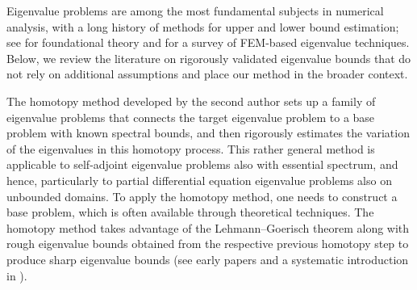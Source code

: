 \documentclass[a4,11pt]{article}
\numberwithin{equation}{section}
\begin{document}
\medskip



Eigenvalue problems are among the most fundamental subjects in numerical analysis, with a long history of methods for upper and lower bound estimation; see \cite{Babuska-Osborn-1991} for foundational theory and \cite{Boffi2010} for a survey of FEM-based eigenvalue techniques.
Below, we review the literature on rigorously validated eigenvalue bounds that do not rely on additional assumptions and place our method in the broader context.


The homotopy method developed by the second author \cite{plum1991bounds} sets up a family of 
eigenvalue problems that connects the target eigenvalue problem to a base problem with known  spectral bounds, 
and then rigorously estimates the variation of the eigenvalues in this homotopy process. 
This rather general method is applicable to self-adjoint eigenvalue problems also with essential spectrum, and hence, particularly to partial differential equation eigenvalue problems also on unbounded domains. 
To apply the homotopy method, one needs to construct a base problem, which is often available through theoretical techniques.  
The homotopy method takes advantage of the Lehmann--Goerisch theorem  along with rough eigenvalue bounds obtained from the respective previous homotopy step to produce sharp eigenvalue bounds (see early papers \cite{Lehmann1963,behnke1994inclusions,GoerischHe1990,Albrecht1987,plum1990eigenvalue,plum1991bounds,plum1997guaranteed} and a systematic introduction in \cite[Chapter 10]{nakao2019numerical_book}).
\end{document}
